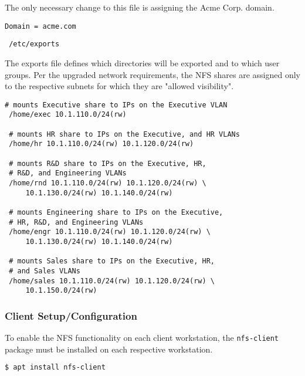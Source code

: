 \noindent
The only necessary change to this file is assigning the Acme Corp. domain. \\

\begin{lstlisting}[backgroundcolor=\color{Gray}]
 Domain = acme.com
\end{lstlisting}

\begin{lstlisting}
 /etc/exports
\end{lstlisting}
\vspace{1em}

\noindent
The exports file defines which directories will be exported and to which
user groups. Per the upgraded network requirements, the NFS shares are assigned 
only to the respective subnets for which they are "allowed visibility". \\

\begin{lstlisting}[backgroundcolor=\color{Gray}]
 # mounts Executive share to IPs on the Executive VLAN
 /home/exec 10.1.110.0/24(rw)

 # mounts HR share to IPs on the Executive, and HR VLANs
 /home/hr 10.1.110.0/24(rw) 10.1.120.0/24(rw)

 # mounts R&D share to IPs on the Executive, HR, 
 # R&D, and Engineering VLANs
 /home/rnd 10.1.110.0/24(rw) 10.1.120.0/24(rw) \
     10.1.130.0/24(rw) 10.1.140.0/24(rw)

 # mounts Engineering share to IPs on the Executive, 
 # HR, R&D, and Engineering VLANs
 /home/engr 10.1.110.0/24(rw) 10.1.120.0/24(rw) \
     10.1.130.0/24(rw) 10.1.140.0/24(rw)

 # mounts Sales share to IPs on the Executive, HR, 
 # and Sales VLANs
 /home/sales 10.1.110.0/24(rw) 10.1.120.0/24(rw) \
     10.1.150.0/24(rw)
\end{lstlisting}

\subsubsection{Client Setup/Configuration}
To enable the NFS functionality on each client workstation, the
\lstinline$nfs-client$ package must be installed on each respective workstation.
\\

\begin{lstlisting}[backgroundcolor=\color{Gray}, language=bash]
 $ apt install nfs-client
\end{lstlisting}
\vspace{1em}

